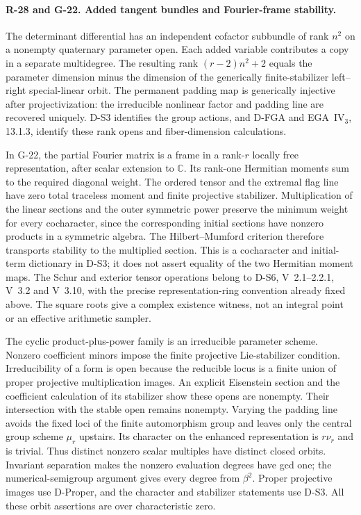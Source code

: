 \paragraph{R-28 and G-22. Added tangent bundles and Fourier-frame stability.}
The determinant differential has an independent cofactor subbundle
of rank $n^2$ on a nonempty quaternary parameter open. Each added
variable contributes a copy in a separate multidegree. The resulting
rank $(r-2)n^2+2$ equals the parameter dimension minus the dimension
of the generically finite-stabilizer left--right special-linear
orbit. The permanent padding map is generically injective after
projectivization: the irreducible nonlinear factor and padding
line are recovered uniquely. D-S3 identifies the group actions,
and D-FGA and EGA~IV$_3$, 13.1.3, identify these rank opens and
fiber-dimension calculations.

In G-22, the partial Fourier matrix is a frame in a rank-$r$
locally free representation, after scalar extension to $\mathbb C$.
Its rank-one Hermitian moments sum to the required diagonal
weight. The ordered tensor and the extremal flag line have
zero total traceless moment and finite projective stabilizer.
Multiplication of the linear sections and the outer symmetric
power preserve the minimum weight for every cocharacter, since
the corresponding initial sections have nonzero products in a
symmetric algebra. The Hilbert--Mumford criterion therefore
transports stability to the multiplied section. This is a
cocharacter and initial-term dictionary in D-S3; it does not
assert equality of the two Hermitian moment maps. The Schur
and exterior tensor operations belong to D-S6, V~2.1--2.2.1,
V~3.2 and V~3.10, with the precise representation-ring convention
already fixed above. The square roots give a complex existence
witness, not an integral point or an effective arithmetic sampler.

The cyclic product-plus-power family is an irreducible parameter
scheme. Nonzero coefficient minors impose the finite projective
Lie-stabilizer condition. Irreducibility of a form is open because
the reducible locus is a finite union of proper projective
multiplication images. An explicit Eisenstein section and the
coefficient calculation of its stabilizer show these opens are
nonempty. Their intersection with the stable open remains nonempty.
Varying the padding line avoids the fixed loci of the finite
automorphism group and leaves only the central group scheme
$\mu_r$ upstairs. Its character on the enhanced representation
is $r\nu_r$ and is trivial. Thus distinct nonzero scalar multiples
have distinct closed orbits. Invariant separation makes the
nonzero evaluation degrees have gcd one; the numerical-semigroup
argument gives every degree from $\beta^2$. Proper projective
images use D-Proper, and the character and stabilizer statements
use D-S3. All these orbit assertions are over characteristic zero.

